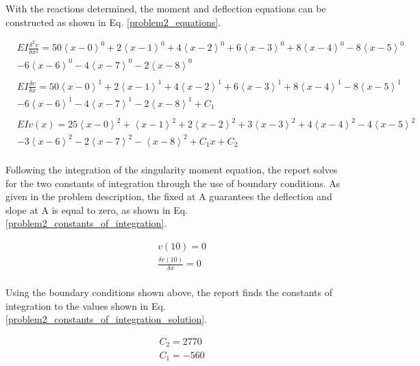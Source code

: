\documentclass[a4paper]{article}
\begin{document}
With the reactions determined, the moment and deflection equations can be constructed as shown in Eq. \ref{problem2_equations}.

\begin{equation}
    \begin{split}
& EI \frac{\delta^2 v}{\delta x^2} = 50\left<x-0\right>^0 + 2\left<x-1\right>^0 + 4\left<x-2\right>^0 + 6\left<x-3\right>^0 + 8\left<x-4\right>^0   -  8\left<x-5\right>^0 \\
& - 6\left<x-6\right>^0 -  4\left<x-7\right>^0 - 2\left<x-8\right>^0 \\
& \\
& EI \frac{\delta v}{\delta x} = 50\left<x-0\right>^1 + 2\left<x-1\right>^1 + 4\left<x-2\right>^1 +  6\left<x-3\right>^1 + 8\left<x-4\right>^1   -  8\left<x-5\right>^1 \\
& - 6\left<x-6\right>^1 -  4\left<x-7\right>^1 - 2\left<x-8\right>^1 + C_1 \\
& \\
& EI v(x) = 25\left<x-0\right>^2 + \left<x-1\right>^2 + 2\left<x-2\right>^2 +  3\left<x-3\right>^2 + 4\left<x-4\right>^2   -  4\left<x-5\right>^2 \\
& - 3\left<x-6\right>^2  -  2\left<x-7\right>^2 - \left<x-8\right>^2 + C_1 x + C_2 \\
    \end{split}
\label{problem2_equations}
\end{equation}

Following the integration of the singularity moment equation, the report solves for the two constants of integration through the use of boundary conditions. As given in the problem description, the fixed at A guarantees the deflection and slope at A is equal to zero, as shown in Eq. \ref{problem2_constants_of_integration}.

\begin{equation}
\begin{split}
	& v(10) = 0 \\
	& \frac{\delta v(10)}{\delta x} = 0 \\
\end{split}
\label{problem2_constants_of_integration}
\end{equation}

Using the boundary conditions shown above, the report finds the constants of integration to the values shown in Eq. \ref{problem2_constants_of_integration_solution}.

\begin{equation}
\begin{split}
	& C_2 = 2770 \\
	& C_1 = -560 \\
\end{split}
\label{problem2_constants_of_integration_solution}
\end{equation}
\end{document}
